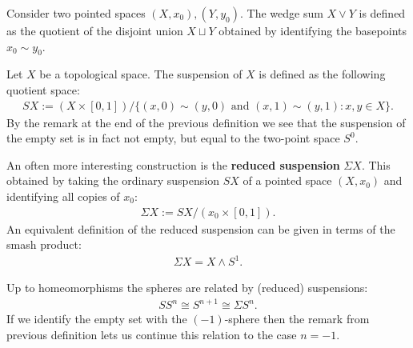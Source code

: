     \begin{construct}
        Consider two pointed spaces $(X, x_0), (Y, y_0)$. The wedge sum $X\vee Y$ is defined as the quotient of the disjoint union $X\sqcup Y$ obtained by identifying the basepoints $x_0\sim y_0$.
    \end{construct}

    \begin{construct}[Suspension]\label{topology:suspension}
        Let $X$ be a topological space. The suspension of $X$ is defined as the following quotient space:
        \begin{gather}
            SX := (X\times [0, 1])/\big\{(x, 0) \sim (y, 0)\text{ and }(x, 1) \sim (y, 1):x, y\in X\big\}.
        \end{gather}
        By the remark at the end of the previous definition we see that the suspension of the empty set is in fact not empty, but equal to the two-point space $S^0$.

        An often more interesting construction is the \textbf{reduced suspension} $\Sigma X$. This obtained by taking the ordinary suspension $SX$ of a pointed space $(X, x_0)$ and identifying all copies of $x_0$:
        \begin{gather}
            \Sigma X := SX/(x_0\times[0,1]).
        \end{gather}
        An equivalent definition of the reduced suspension can be given in terms of the smash product:
        \begin{gather}
            \Sigma X = X\wedge S^1.
        \end{gather}
    \end{construct}
    \begin{example}[Spheres]\label{topology:sphere_suspension}
        Up to homeomorphisms the spheres are related by (reduced) suspensions:
        \begin{gather}
            SS^n \cong S^{n+1} \cong \Sigma S^n.
        \end{gather}
        If we identify the empty set with the $(-1)$-sphere then the remark from previous definition lets us continue this relation to the case $n=-1$.
    \end{example}

